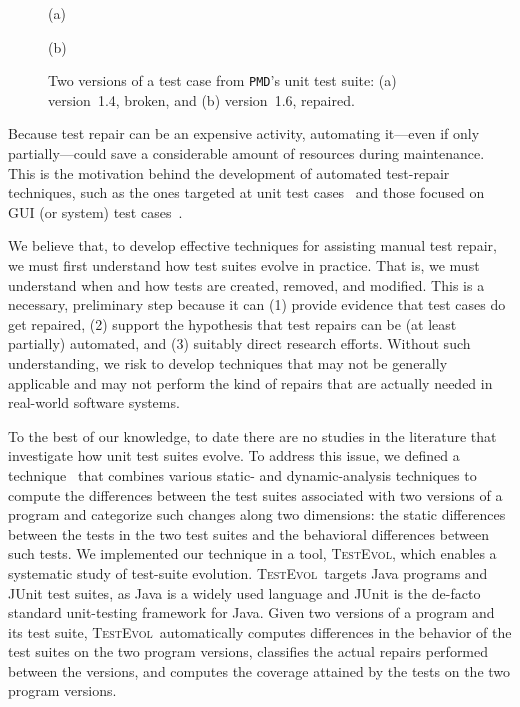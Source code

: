 \documentclass[conference]{IEEEtran}
\newcommand{\subject}[1]{\texttt{\small #1}}
\newcommand{\tool}{\textsc{TestEvol}\xspace}
\begin{document}
\begin{figure}[t]

\vspace*{-4pt}
\centerline{(a)}

\vspace*{-4pt}
\centerline{(b)}
\vspace*{-8pt}
\caption{Two versions of a test case from \subject{PMD}'s unit test
  suite: (a) version~1.4, broken, and (b) version~1.6, repaired.}
\vspace*{-12pt}
\label{fig:pmd-javatokenizertest}
\end{figure}

Because test repair can be an expensive activity, automating it---even
if only partially---could save a considerable amount of resources
during maintenance. This is the motivation behind the development of
automated test-repair techniques, such as the ones targeted at unit
test cases~\cite{Daniel:2009, Daniel:2010, Mirzaaghaei:2012} and those
focused on GUI (or system) test cases~\cite{Choudhary:2011,
  Grechanik:2009, Huang:2010, Memon:2008}.

We believe that, to develop effective techniques for assisting manual
test repair, we must first understand how test suites evolve in
practice. That is, we must understand when and how tests are created,
removed, and modified. This is a necessary, preliminary step because
it can (1) provide evidence that test cases do get repaired, (2)
support the hypothesis that test repairs can be (at least partially)
automated, and (3) suitably direct research efforts.  Without such
understanding, we risk to develop techniques that may not be generally
applicable and may not perform the kind of repairs that are actually
needed in real-world software systems.

To the best of our knowledge, to date there are no studies in the
literature that investigate how unit test suites evolve. To address
this issue, we defined a technique~\cite{pinto12} that combines
various static- and dynamic-analysis techniques to compute the
differences between the test suites associated with two versions of a
program and categorize such changes along two dimensions: the static
differences between the tests in the two test suites and the
behavioral differences between such tests.  We implemented our
technique in a tool, \tool, which enables a systematic study of
test-suite evolution. \tool\ targets Java programs and JUnit test
suites, as Java is a widely used language and JUnit is the de-facto
standard unit-testing framework for Java.  Given two versions of a
program and its test suite, \tool\ automatically computes differences
in the behavior of the test suites on the two program versions,
classifies the actual repairs performed between the versions, and
computes the coverage attained by the tests on the two program
versions.
\end{document}
